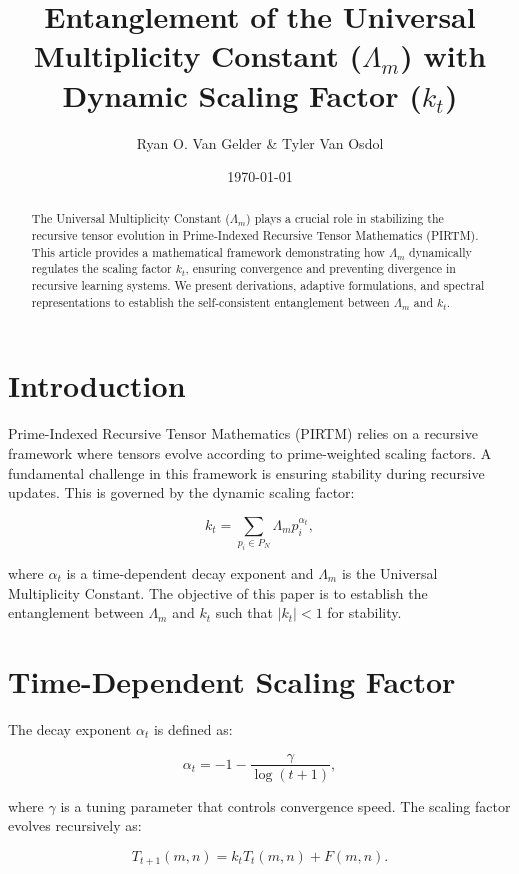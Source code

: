 \documentclass{article}
\title{Entanglement of the Universal Multiplicity Constant ($\Lambda_m$) with Dynamic Scaling Factor ($k_t$)}
\author{Ryan O. Van Gelder \& Tyler Van Osdol}
\date{\today}
\theoremstyle{plain}
\begin{document}
\maketitle

\begin{abstract}
The Universal Multiplicity Constant ($\Lambda_m$) plays a crucial role in stabilizing the recursive tensor evolution in Prime-Indexed Recursive Tensor Mathematics (PIRTM). This article provides a mathematical framework demonstrating how $\Lambda_m$ dynamically regulates the scaling factor $k_t$, ensuring convergence and preventing divergence in recursive learning systems. We present derivations, adaptive formulations, and spectral representations to establish the self-consistent entanglement between $\Lambda_m$ and $k_t$.
\end{abstract}

\section{Introduction}
Prime-Indexed Recursive Tensor Mathematics (PIRTM) relies on a recursive framework where tensors evolve according to prime-weighted scaling factors. A fundamental challenge in this framework is ensuring stability during recursive updates. This is governed by the dynamic scaling factor:

\begin{equation}
    k_t = \sum_{p_i \in P_N} \Lambda_m p_i^{\alpha_t},
\end{equation}

where $\alpha_t$ is a time-dependent decay exponent and $\Lambda_m$ is the Universal Multiplicity Constant. The objective of this paper is to establish the entanglement between $\Lambda_m$ and $k_t$ such that $|k_t| < 1$ for stability.

\section{Time-Dependent Scaling Factor}
The decay exponent $\alpha_t$ is defined as:

\begin{equation}
    \alpha_t = -1 - \frac{\gamma}{\log(t+1)},
\end{equation}

where $\gamma$ is a tuning parameter that controls convergence speed. The scaling factor evolves recursively as:

\begin{equation}
    T_{t+1}(m,n) = k_t T_t(m,n) + F(m,n).
\end{equation}
\end{document}
